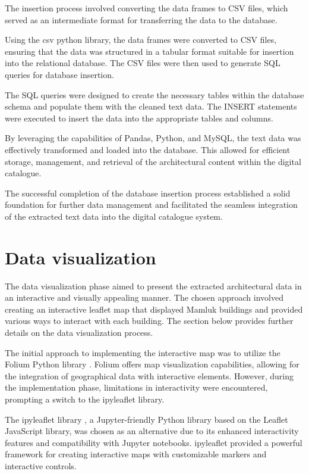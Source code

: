 The insertion process involved converting the data frames to CSV files, which served as an intermediate format for transferring the data to the database.

Using the csv python library, the data frames were converted to CSV files, ensuring that the data was structured in a tabular format suitable for insertion into the relational database. The CSV files were then used to generate SQL queries for database insertion.

The SQL queries were designed to create the necessary tables within the database schema and populate them with the cleaned text data. The INSERT statements were executed to insert the data into the appropriate tables and columns.

By leveraging the capabilities of Pandas, Python, and MySQL, the text data was effectively transformed and loaded into the database. This allowed for efficient storage, management, and retrieval of the architectural content within the digital catalogue.

The successful completion of the database insertion process established a solid foundation for further data management and facilitated the seamless integration of the extracted text data into the digital catalogue system.

\section{Data visualization}
The data visualization phase aimed to present the extracted architectural data in an interactive and visually appealing manner. The chosen approach involved creating an interactive leaflet map that displayed Mamluk buildings and provided various ways to interact with each building. The section below provides further details on the data visualization process.

The initial approach to implementing the interactive map was to utilize the Folium Python library \parencite{folium}. Folium offers map visualization capabilities, allowing for the integration of geographical data with interactive elements. However, during the implementation phase, limitations in interactivity were encountered, prompting a switch to the ipyleaflet library.

The ipyleaflet library \parencite{ipyleaflet}, a Jupyter-friendly Python library based on the Leaflet JavaScript library, was chosen as an alternative due to its enhanced interactivity features and compatibility with Jupyter notebooks. ipyleaflet provided a powerful framework for creating interactive maps with customizable markers and interactive controls.

